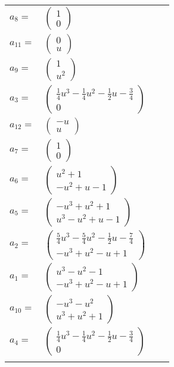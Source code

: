 \documentclass[1p]{elsarticle_modified}
\theoremstyle{definition}
\begin{document}
\begin{tabular}{m{7pt} m{180pt} m{7pt} m{180pt} }
\flushright $a_{8}=$&$\begin{pmatrix}1\\0\end{pmatrix}$ \\
\flushright $a_{11}=$&$\begin{pmatrix}0\\u\end{pmatrix}$ \\
\flushright $a_{9}=$&$\begin{pmatrix}1\\u^2\end{pmatrix}$ \\
\flushright $a_{3}=$&$\begin{pmatrix}\frac{1}{4} u^3-\frac{1}{4} u^2-\frac{1}{2} u-\frac{3}{4}\\0\end{pmatrix}$ \\
\flushright $a_{12}=$&$\begin{pmatrix}- u\\u\end{pmatrix}$ \\
\flushright $a_{7}=$&$\begin{pmatrix}1\\0\end{pmatrix}$ \\
\flushright $a_{6}=$&$\begin{pmatrix}u^2+1\\- u^2+u-1\end{pmatrix}$ \\
\flushright $a_{5}=$&$\begin{pmatrix}- u^3+u^2+1\\u^3- u^2+u-1\end{pmatrix}$ \\
\flushright $a_{2}=$&$\begin{pmatrix}\frac{5}{4} u^3-\frac{5}{4} u^2-\frac{1}{2} u-\frac{7}{4}\\- u^3+u^2- u+1\end{pmatrix}$ \\
\flushright $a_{1}=$&$\begin{pmatrix}u^3- u^2-1\\- u^3+u^2- u+1\end{pmatrix}$ \\
\flushright $a_{10}=$&$\begin{pmatrix}- u^3- u^2\\u^3+u^2+1\end{pmatrix}$ \\
\flushright $a_{4}=$&$\begin{pmatrix}\frac{1}{4} u^3-\frac{1}{4} u^2-\frac{1}{2} u-\frac{3}{4}\\0\end{pmatrix}$\\&\end{tabular}
\end{document}

